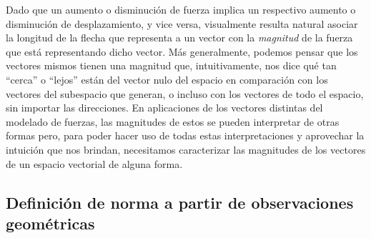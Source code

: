 \documentclass[12pt,dvipsnames]{article}
\numberwithin{equation}{section}
\begin{document}
Dado que un aumento o disminución de fuerza implica un respectivo aumento o disminución de desplazamiento, y vice versa, visualmente resulta natural asociar la longitud de la flecha que representa a un vector con la \emph{magnitud} de la fuerza que está representando dicho vector. Más generalmente, podemos pensar que los vectores mismos tienen una magnitud que, intuitivamente, nos dice qué tan ``cerca'' o ``lejos'' están del vector nulo del espacio en comparación con los vectores del subespacio que generan, o incluso con los vectores de todo el espacio, sin importar las direcciones. En aplicaciones de los vectores distintas del modelado de fuerzas, las magnitudes de estos se pueden interpretar de otras formas pero, para poder hacer uso de todas estas interpretaciones y aprovechar la intuición que nos brindan, necesitamos caracterizar las magnitudes de los vectores de un espacio vectorial de alguna forma.

\subsection{Definición de norma a partir de observaciones geométricas}

\end{document}
